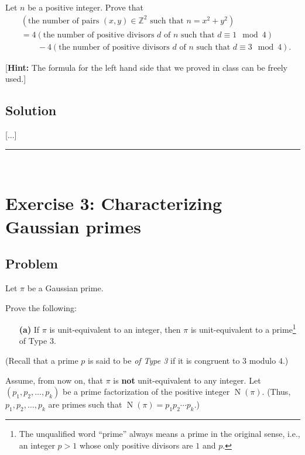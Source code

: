\documentclass[paper=a4, fontsize=12pt]{scrartcl} %
\newcommand{\ZZ}{\mathbb{Z}} %
\newcommand{\tup}[1]{\left( #1 \right)}
\newcommand{\N}{\operatorname{N}} %
\newcommand{\horrule}[1]{\rule{\linewidth}{#1}} %
\theoremstyle{plainsl}
\theoremstyle{definition}
\theoremstyle{remark}
\begin{document}
Let $n$ be a positive integer.
Prove that
\begin{align*}
& \tup{\text{the number of pairs $\tup{x, y} \in \ZZ^2$ such that $n = x^2 + y^2$}} \\
& = 4 \tup{\text{the number of positive divisors $d$ of $n$ such that $d \equiv 1 \mod 4$}} \\
& \qquad - 4 \tup{\text{the number of positive divisors $d$ of $n$ such that $d \equiv 3 \mod 4$}} .
\end{align*}

[\textbf{Hint:} The formula for the left hand side
that we proved in class can be freely used.]

\subsection{Solution}

[...]

\horrule{0.3pt} \\[0.4cm]

\section{Exercise 3: Characterizing Gaussian primes}

\subsection{Problem}

Let $\pi$ be a Gaussian prime.

Prove the following:

\begin{enumerate}

\item[\textbf{(a)}]
If $\pi$ is unit-equivalent to an integer, then $\pi$
is unit-equivalent to a prime\footnote{%
The unqualified word ``prime'' always means a prime in the
original sense, i.e., an integer $p > 1$ whose only positive
divisors are $1$ and $p$.}
of Type 3.

\end{enumerate}

\noindent
(Recall that a prime $p$ is said to be \textit{of Type 3}
if it is congruent to $3$ modulo $4$.)

Assume, from now on, that $\pi$ is \textbf{not}
unit-equivalent to any integer.
Let $\tup{p_1, p_2, \ldots, p_k}$ be a prime factorization
of the positive integer $\N\tup{\pi}$.
(Thus, $p_1, p_2, \ldots, p_k$ are primes such that
$\N\tup{\pi} = p_1 p_2 \cdots p_k$.)
\end{document}
